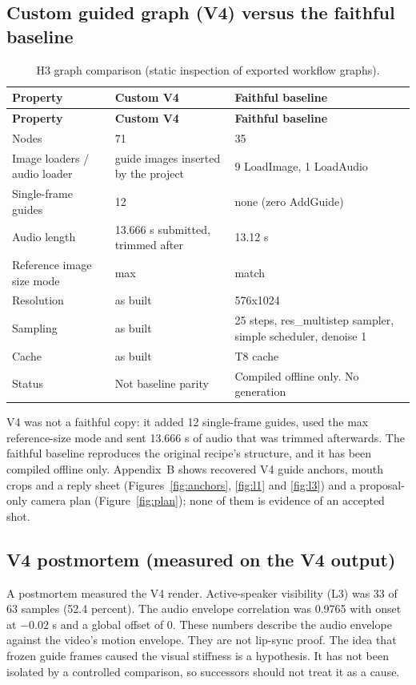 \documentclass[11pt,a4paper]{article}
\begin{document}
\subsection{Custom guided graph (V4) versus the faithful baseline}
\begin{longtable}{@{}P{4.0cm}P{5.7cm}P{5.8cm}@{}}
\caption{H3 graph comparison (static inspection of exported workflow graphs).}\\
\toprule \textbf{Property} & \textbf{Custom V4} & \textbf{Faithful baseline}\\ \midrule\endfirsthead
\toprule \textbf{Property} & \textbf{Custom V4} & \textbf{Faithful baseline}\\ \midrule\endhead
Nodes & 71 & 35\\
Image loaders / audio loader & guide images inserted by the project & 9 LoadImage, 1 LoadAudio\\
Single-frame guides & 12 & none (zero AddGuide)\\
Audio length & 13.666 s submitted, trimmed after & 13.12 s\\
Reference image size mode & max & match\\
Resolution & as built & 576x1024\\
Sampling & as built & 25 steps, res\_multistep sampler, simple scheduler, denoise 1\\
Cache & as built & T8 cache\\
Status & Not baseline parity & Compiled offline only. No generation\\
\bottomrule
\end{longtable}
V4 was not a faithful copy: it added 12 single-frame guides, used the max reference-size mode and sent 13.666 s of audio that was trimmed afterwards. The faithful baseline reproduces the original recipe's structure, and it has been compiled offline only. Appendix~B shows recovered V4 guide anchors, mouth crops and a reply sheet (Figures~\ref{fig:anchors}, \ref{fig:l1} and \ref{fig:l3}) and a proposal-only camera plan (Figure~\ref{fig:plan}); none of them is evidence of an accepted shot.

\subsection{V4 postmortem (measured on the V4 output)}
A postmortem measured the V4 render. Active-speaker visibility (L3) was 33 of 63 samples (52.4 percent). The audio envelope correlation was 0.9765 with onset at $-0.02$ s and a global offset of 0. These numbers describe the audio envelope against the video's motion envelope. They are not lip-sync proof. The idea that frozen guide frames caused the visual stiffness is a hypothesis. It has not been isolated by a controlled comparison, so successors should not treat it as a cause.
\end{document}
